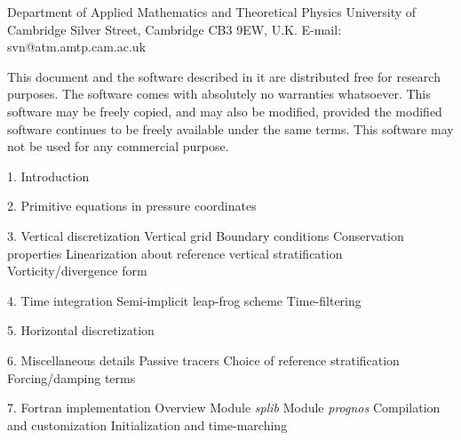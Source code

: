 \def\Mx[#1,#2]{{ M_{#1 \rightarrow #2} }}   %
 
\def\vdiv#1{{ {\left(\pd[#1,p]\right)}_l }} %
\def\tt[#1,#2]{{ {\left(\pd[#1,t]\right)}^{#2} }}
\def\delh{\mathop{{\v \nabla}_H}}           %
\def\deleight{\mathop{{\v \nabla}_H^8}}     %
\def\div{\mathop{\rm div}}                  %
\def\curlz{\mathop{\rm curl_z}}             %
\def\delsq{\mathop{\nabla_H^2}}             %
 
\def\Pmn[#1,#2]{ P_{#1,#2} }                %
\def\Ymn[#1,#2]{ Y_{#1,#2} }                %
 
 
\Address Department of Applied Mathematics and Theoretical Physics\cr
         University of Cambridge\cr
         Silver Street, Cambridge CB3 9EW, U.K.\cr
         E-mail: svn@atm.amtp.cam.ac.uk\cr\period
 
\bigskip
 
This document and the software described in it are distributed free for
research purposes. The software comes with absolutely no warranties
whatsoever. This software may be freely copied, and may also be modified,
provided the modified software continues to be freely available under the
same terms. This software may not be used for any commercial purpose.
 
\vfill\eject
 
\item{1.} Introduction
\item{2.} Primitive equations in pressure coordinates
\item{3.} Vertical discretization
 Vertical grid
 Boundary conditions
 Conservation properties
 Linearization about reference vertical stratification
 Vorticity/divergence form
\item{4.} Time integration
 Semi-implicit leap-frog scheme
 Time-filtering
\item{5.} Horizontal discretization
\item{6.} Miscellaneous details
 Passive tracers
 Choice of reference stratification
 Forcing/damping terms
\item{7.} Fortran implementation
 Overview
 Module {\it splib}
 Module {\it prognos}
 Compilation and customization
 Initialization and time-marching
 
